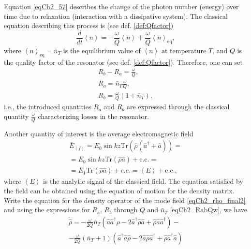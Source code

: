 Equation \eqref{eqCh2_57} describes the change of the photon number (energy)
over time due to relaxation (interaction with a dissipative
system). The classical equation describing this process is
(see def. \ref{def:Qfactor})
\begin{equation}
\frac{d}{d t}\left<n\right> = 
- \frac{\omega}{Q}\left<n\right> + \frac{\omega}{Q} \left<n\right>_{\mathrm{eq}},
\nonumber
\end{equation}
where $\left<n\right>_{\mathrm{eq}} = \bar{n}_T$ is the equilibrium value of
$\left<n\right>$ at temperature $T$, and $Q$ is the quality factor of the resonator
(see def. \ref{def:Qfactor}).
Therefore, one can set
\begin{eqnarray}
R_b - R_a = \frac{\omega}{Q},
\nonumber \\
R_a = \bar{n}_T \frac{\omega}{Q},
\nonumber \\
R_b = \frac{\omega}{Q} \left(1 + \bar{n}_T\right),
\label{eqCh2_RabQw}
\end{eqnarray}
i.e., the introduced quantities $R_a$ and $R_b$ are expressed through
the classical quantity $\frac{\omega}{Q}$ characterizing losses in
the resonator. 

Another quantity of interest is the average electromagnetic field
\begin{eqnarray}
\bar{E}_{(f)} = E_0 \sin k z
\mathrm{Tr}\left(\hat{\rho}\left(\hat{a}^{\dag} + \hat{a}\right)\right) = 
\nonumber \\
= E_0 \sin k z \mathrm{Tr}\left(\hat{\rho}\hat{a}\right) + \mathrm{c.c.} = 
\nonumber \\
= E_1 \mathrm{Tr}\left(\hat{\rho}\hat{a}\right) + \mathrm{c.c.} =
\left<E\right> + \mathrm{c.c.}, 
\nonumber
\end{eqnarray}
where $\left<E\right>$ is the analytic signal of the classical
field. 
The equation satisfied by the field can be obtained using the equation of motion for the density matrix. Write the equation for
the density operator of the mode field  
\eqref{eqCh2_rho_final2} and
using the expressions for $R_a$, $R_b$ through $Q$ and $\bar{n}_T$
 \eqref{eqCh2_RabQw}, we have
\begin{eqnarray}
\dot{\hat{\rho}} =
- \frac{\omega}{2Q}\bar{n}_T
\left(\hat{a}\hat{a}^{\dag}\hat{\rho} - 
2 \hat{a}^{\dag}\hat{\rho}\hat{a} + \hat{\rho}\hat{a}\hat{a}^{\dag}
\right)
- 
\nonumber \\
- \frac{\omega}{2Q}\left(\bar{n}_T + 1\right)
\left(\hat{a}^{\dag}\hat{a}\hat{\rho} - 
2 \hat{a}\hat{\rho}\hat{a}^{\dag}
+ \hat{\rho}\hat{a}^{\dag}\hat{a}
\right)
\label{eqCh2_eq1_add1}
\end{eqnarray}

